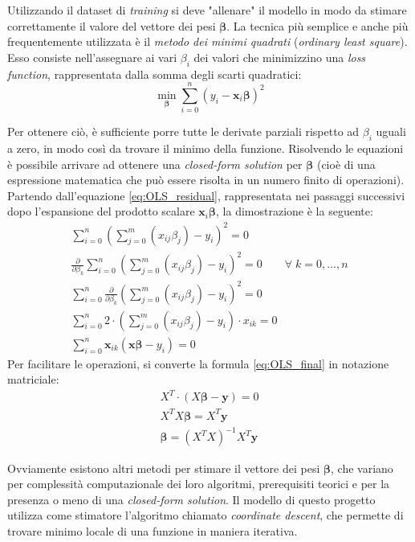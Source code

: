 Utilizzando il dataset di \textit{training} si deve "allenare" il modello in modo da stimare correttamente il valore del 
vettore dei pesi $\bm{\beta}$. La tecnica più semplice e anche più frequentemente utilizzata è il \textit{metodo dei minimi 
quadrati} (\textit{ordinary least square})\cite{dismuke2006ordinary}. Esso consiste nell'assegnare ai vari $\beta_i$ dei 
valori che minimizzino una \textit{loss function}, rappresentata dalla somma degli scarti quadratici:
\begin{equation}
\min_{\bm{\beta}} \sum_{i=0}^n(y_i - \bm{x}_i\bm{\beta})^2
\label{eq:OLS_residual}
\end{equation}

Per ottenere ciò, è sufficiente porre tutte le derivate parziali rispetto ad $\beta_i$
uguali a zero, in modo così da trovare il minimo della funzione. Risolvendo le equazioni è possibile arrivare ad ottenere una \textit{closed-form solution} per $\bm{\beta}$ 
(cioè di una espressione matematica che può essere risolta in un numero finito di operazioni). Partendo dall'equazione 
\eqref{eq:OLS_residual}, rappresentata nei passaggi successivi dopo l'espansione del prodotto scalare $\bm{x}_i\bm{\beta}$, 
la dimostrazione è la seguente:
\begin{gather}
	\sum_{i=0}^n\left(\sum_{j=0}^m\left(x_{ij}\beta_j\right)-y_i\right)^2 = 0 \qquad  \\
	\frac{\partial}{\partial\beta_k}\sum_{i=0}^n\left(\sum_{j=0}^m\left(x_{ij}\beta_j\right)-y_i\right)^2 = 0	\qquad \forall \; k=0,\ldots,n \label{eq:OLS_minimize} \\
	\sum_{i=0}^n\frac{\partial}{\partial\beta_k}\left(\sum_{j=0}^m\left(x_{ij}\beta_j\right)-y_i\right)^2 = 0\\
	\sum_{i=0}^n 2\cdot \left(\sum_{j=0}^m \left(x_{ij}\beta_j\right)-y_i\right)\cdot x_{ik} = 0 \\
	\sum_{i=0}^n \bm{x}_{ik}\left(\bm{x}\bm{\beta}-y_i\right) =0 \label{eq:OLS_final}
\end{gather}
Per facilitare le operazioni, si converte la formula \eqref{eq:OLS_final} in notazione matriciale:
\begin{gather}
	X^T \cdot \left( X \bm{\beta} - \bm{y} \right) = 0 \\
	X^T X \bm{\beta} = X^T \bm{y}\\
	\bm{\beta} = \left( X^TX\right)^{-1}X^T\bm{y}
\end{gather}	

Ovviamente esistono altri metodi per stimare il vettore dei pesi $\bm{\beta}$, che variano per complessità 
computazionale dei loro algoritmi, prerequisiti teorici e per la presenza o meno di una \textit{closed-form solution}.  
Il modello di questo progetto utilizza come stimatore l'algoritmo chiamato \textit{coordinate descent}, che permette di trovare minimo locale di una funzione in maniera iterativa.
\bigskip


